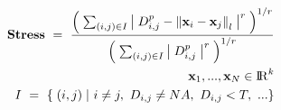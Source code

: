 


\newcommand{\Reals}   {{\rm I\! R}}
\newcommand{\vx}      {{\mbox{\bf x}}}
\renewcommand\slidetopmargin{2in}
\setlength\slidewidth{7in}



\renewcommand{\familydefault}{cmss}

\begin{slide*}


\begin{eqnarray*}
&& {\bf Stress} ~=~ 
    \frac{ 
      \left( \; 
        \sum_{ (i,j) \in I }
        \left| \; D_{i,j}^p - {\| \vx_i - \vx_j \|}_l \; \right|^r  
      \; \right)^{1/r}
    }{
      \left( \;
        \sum_{ (i,j) \in I }
        \left| \; D_{i,j}^p \; \right|^r 
      \; \right)^{1/r}
    }
\\
&& \vx_1,...,\vx_N \in \Reals^k
\\
&& I ~=~\{ \; (i,j) \; |~ i \neq j ,~D_{i,j} \neq NA ,~D_{i,j}< T ,~ ...  \}
\end{eqnarray*}


\end{slide*}



